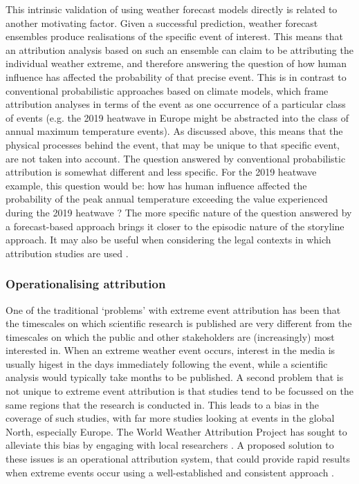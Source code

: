     This intrinsic validation of using weather forecast models directly is related to another motivating factor. Given a successful prediction, weather forecast ensembles produce realisations of the specific event of interest. This means that an attribution analysis based on such an ensemble can claim to be attributing the individual weather extreme, and therefore answering the question of how human influence has affected the probability of that precise event. This is in contrast to conventional probabilistic approaches based on climate models, which frame attribution analyses in terms of the event as one occurrence of a particular class of events (e.g. the 2019 heatwave in Europe might be abstracted into the class of annual maximum temperature events). As discussed above, this means that the physical processes behind the event, that may be unique to that specific event, are not taken into account. The question answered by conventional probabilistic attribution is somewhat different and less specific. For the 2019 heatwave example, this question would be: how has human influence affected the probability of the peak annual temperature exceeding the value experienced during the 2019 heatwave \citep{vautard_human_2020}? The more specific nature of the question answered by a forecast-based approach brings it closer to the episodic nature of the storyline approach. It may also be useful when considering the legal contexts in which attribution studies are used \citep{lloyd_climate_2021-1}.

    \subsubsection{Operationalising attribution}

      One of the traditional `problems' with extreme event attribution has been that the timescales on which scientific research is published are very different from the timescales on which the public and other stakeholders are (increasingly) most interested in. When an extreme weather event occurs, interest in the media is usually higest in the days immediately following the event, while a scientific analysis would typically take months to be published. A second problem that is not unique to extreme event attribution is that studies tend to be focussed on the same regions that the research is conducted in. This leads to a bias in the coverage of such studies, with far more studies looking at events in the global North, especially Europe. The World Weather Attribution Project has sought to alleviate this bias by engaging with local researchers \citep{van_oldenborgh_pathways_2021}. A proposed solution to these issues is an operational attribution system, that could provide rapid results when extreme events occur using a well-established and consistent approach \citep{national_academies_of_sciences_engineering_and_medicine_attribution_2016}.

